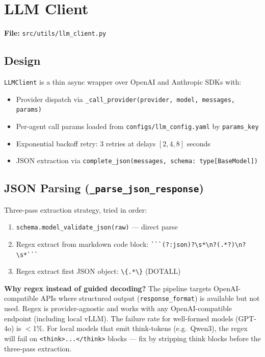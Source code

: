 \documentclass[11pt,a4paper]{article}
\begin{document}
\section{LLM Client}
\label{sec:llm}

\textbf{File:} \texttt{src/utils/llm\_client.py}

\subsection{Design}

\texttt{LLMClient} is a thin async wrapper over OpenAI and Anthropic SDKs with:
\begin{itemize}[leftmargin=*,noitemsep]
  \item Provider dispatch via \texttt{\_call\_provider(provider, model, messages, params)}
  \item Per-agent call params loaded from \texttt{configs/llm\_config.yaml} by \texttt{params\_key}
  \item Exponential backoff retry: 3 retries at delays $[2, 4, 8]$ seconds
  \item JSON extraction via \texttt{complete\_json(messages, schema: type[BaseModel])}
\end{itemize}

\subsection{JSON Parsing (\texttt{\_parse\_json\_response})}

Three-pass extraction strategy, tried in order:
\begin{enumerate}[leftmargin=*,noitemsep]
  \item \texttt{schema.model\_validate\_json(raw)} — direct parse
  \item Regex extract from markdown code block: \verb|```(?:json)?\s*\n?(.*?)\n?\s*```|
  \item Regex extract first JSON object: \verb|\{.*\}| (DOTALL)
\end{enumerate}

\textbf{Why regex instead of guided decoding?} The pipeline targets OpenAI-compatible APIs where structured output (\texttt{response\_format}) is available but not used. Regex is provider-agnostic and works with any OpenAI-compatible endpoint (including local vLLM). The failure rate for well-formed models (GPT-4o) is $<$1\%. For local models that emit think-tokens (e.g.\ Qwen3), the regex will fail on \texttt{<think>...</think>} blocks --- fix by stripping think blocks before the three-pass extraction.
\end{document}

